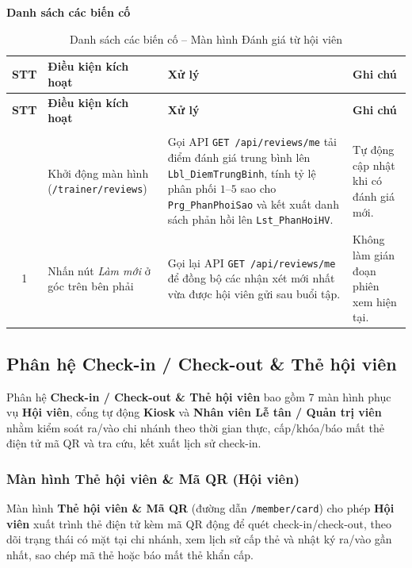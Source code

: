 \documentclass[a4paper,12pt]{article}
\begin{document}
\par\medskip\noindent\textbf{Danh sách các biến cố}\par\smallskip
{\footnotesize
\setlength{\tabcolsep}{4pt}
\begin{longtable}{|c|L{3.5cm}|L{7.8cm}|L{3.5cm}|}
\hline
\textbf{STT} & \textbf{Điều kiện kích hoạt} & \textbf{Xử lý} & \textbf{Ghi chú} \\
\hline
\endfirsthead
\hline
\textbf{STT} & \textbf{Điều kiện kích hoạt} & \textbf{Xử lý} & \textbf{Ghi chú} \\
\hline
\endhead
\hline
\endfoot
\hline
\caption{Danh sách các biến cố -- Màn hình Đánh giá từ hội viên} \\
 & Khởi động màn hình (\texttt{/trainer/reviews}) & Gọi API \texttt{GET /api/reviews/me} tải điểm đánh giá trung bình lên \texttt{Lbl\_DiemTrungBinh}, tính tỷ lệ phân phối $1$--$5$ sao cho \texttt{Prg\_PhanPhoiSao} và kết xuất danh sách phản hồi lên \texttt{Lst\_PhanHoiHV}. & Tự động cập nhật khi có đánh giá mới. \\*  & Nhấn nút \textit{Làm mới} ở góc trên bên phải & Gọi lại API \texttt{GET /api/reviews/me} để đồng bộ các nhận xét mới nhất vừa được hội viên gửi sau buổi tập. & Không làm gián đoạn phiên xem hiện tại. \\ \hline
\end{longtable}
}


\newpage
\subsection{Phân hệ Check-in / Check-out \& Thẻ hội viên}
Phân hệ \textbf{Check-in / Check-out \& Thẻ hội viên} bao gồm 7 màn hình phục vụ \textbf{Hội viên}, cổng tự động \textbf{Kiosk} và \textbf{Nhân viên Lễ tân / Quản trị viên} nhằm kiểm soát ra/vào chi nhánh theo thời gian thực, cấp/khóa/báo mất thẻ điện tử mã QR và tra cứu, kết xuất lịch sử check-in.

\subsubsection{Màn hình Thẻ hội viên \& Mã QR (Hội viên)}
Màn hình \textbf{Thẻ hội viên \& Mã QR} (đường dẫn \texttt{/member/card}) cho phép \textbf{Hội viên} xuất trình thẻ điện tử kèm mã QR động để quét check-in/check-out, theo dõi trạng thái có mặt tại chi nhánh, xem lịch sử cấp thẻ và nhật ký ra/vào gần nhất, sao chép mã thẻ hoặc báo mất thẻ khẩn cấp.
\end{document}
